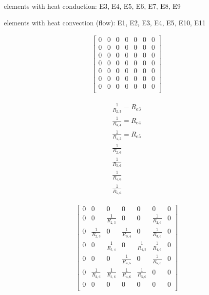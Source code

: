 elements with heat conduction:
E3, E4, E5, E6, E7, E8, E9

elements with heat convection (flow):
E1, E2, E3, E4, E5, E10, E11

\begin{equation}
	\begin{aligned}
		\begin{bmatrix}
			0 & 0 & 0 & 0 & 0 & 0 & 0\\
			0 & 0 & 0 & 0 & 0 & 0 & 0\\
			0 & 0 & 0 & 0 & 0 & 0 & 0\\
			0 & 0 & 0 & 0 & 0 & 0 & 0\\
			0 & 0 & 0 & 0 & 0 & 0 & 0\\
			0 & 0 & 0 & 0 & 0 & 0 & 0\\
			0 & 0 & 0 & 0 & 0 & 0 & 0\\
		\end{bmatrix}
	\end{aligned}
\end{equation}

\begin{equation}
	\begin{aligned}
\frac{1}{R_{2,3}} = R_{e3} \\
\frac{1}{R_{3,4}} = R_{e4} \\
\frac{1}{R_{4,5}} = R_{e5} \\
\frac{1}{R_{2,6}} \\
\frac{1}{R_{3,6}} \\
\frac{1}{R_{4,6}} \\
\frac{1}{R_{5,6}} 
	\end{aligned}
\end{equation}

\begin{equation}
	\begin{aligned}
		\begin{bmatrix}
			0 & 0 & 0 & 0 & 0 & 0 & 0\\
            0 & 0 & \frac{1}{R_{2,3}} & 0 & 0 & \frac{1}{R_{2,6}} & 0 \\
            0 & \frac{1}{R_{2,3}} & 0 & \frac{1}{R_{3,4}} & 0 & \frac{1}{R_{3,6}} & 0\\
            0 & 0 & \frac{1}{R_{3,4}} & 0 & \frac{1}{R_{4,5}} & \frac{1}{R_{4,6}} & 0\\
            0 & 0 & 0 & \frac{1}{R_{4,5}} & 0 & \frac{1}{R_{5,6}} & 0 \\
            0 & \frac{1}{R_{2,6}} & \frac{1}{R_{3,6}} & \frac{1}{R_{4,6}} & \frac{1}{R_{5,6}} & 0 & 0\\
            0 & 0 & 0 & 0 & 0 & 0 & 0\\
		\end{bmatrix}
	\end{aligned}
\end{equation}

